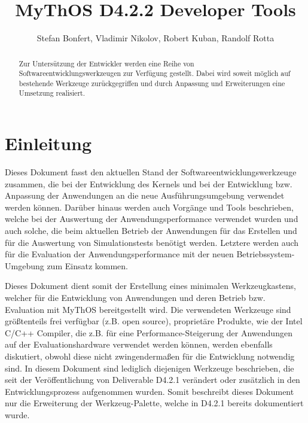 

\title{MyThOS D4.2.2 Developer Tools}
\author{Stefan Bonfert, Vladimir Nikolov, Robert Kuban, Randolf Rotta}



\maketitle

\begin{abstract}

Zur Untersützung der Entwickler werden eine Reihe von
Softwareentwicklungswerkzeugen zur Verfügung gestellt. Dabei wird soweit möglich
auf bestehende Werkzeuge zurückgegriffen und durch Anpassung und Erweiterungen
eine Umsetzung realisiert.

\end{abstract}

\newpage
\tableofcontents
\newpage

\section{Einleitung}

Dieses Dokument fasst den aktuellen Stand der Softwareentwicklungswerkzeuge
zusammen, die bei der Entwicklung des Kernels und bei der Entwicklung bzw.
Anpassung der Anwendungen an die neue Ausführungsumgebung verwendet werden
können. Darüber hinaus werden auch Vorgänge und Tools beschrieben, welche bei
der Auswertung der Anwendungsperformance verwendet wurden und auch solche, die
beim aktuellen Betrieb der Anwendungen für das Erstellen und für die Auswertung
von Simulationstests benötigt werden. Letztere werden auch für die Evaluation
der Anwendungsperformance mit der neuen Betriebssystem-Umgebung zum Einsatz
kommen.

Dieses Dokument dient somit der Erstellung eines minimalen Werkzeugkastens,
welcher für die Entwicklung von Anwendungen und deren Betrieb bzw. Evaluation
mit MyThOS bereitgestellt wird. Die verwendeten Werkzeuge sind größtenteils frei
verfügbar (z.B. open source), proprietäre Produkte, wie der Intel C/C++
Compiler, die z.B. für eine Performance-Steigerung der Anwendungen auf der
Evaluationshardware verwendet werden können, werden ebenfalls diskutiert, obwohl
diese nicht zwingendermaßen für die Entwicklung notwendig sind.
In diesem Dokument sind lediglich diejenigen Werkzeuge beschrieben, die seit der
Veröffentlichung von Deliverable D4.2.1 verändert oder zusätzlich in den
Entwicklungsprozess aufgenommen wurden. Somit beschreibt dieses Dokument nur die
Erweiterung der Werkzeug-Palette, welche in D4.2.1 bereits dokumentiert
wurde.

